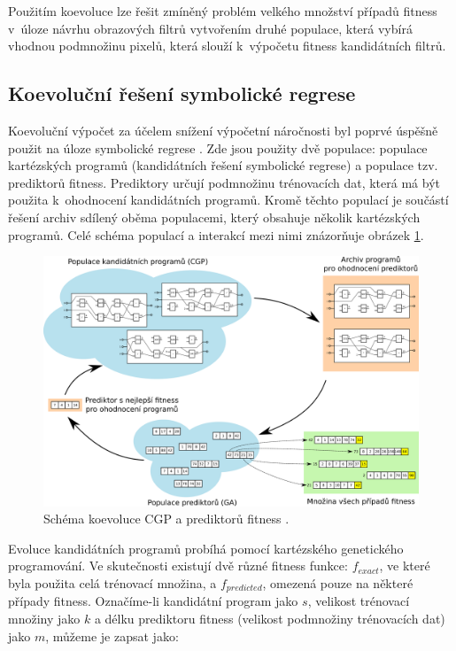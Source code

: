 Použitím koevoluce lze řešit zmíněný problém velkého množství případů fitness v~úloze návrhu obrazových filtrů vytvořením druhé populace, která vybírá vhodnou podmnožinu pixelů, která slouží k~výpočetu fitness kandidátních filtrů.


\subsection{Koevoluční řešení symbolické regrese}

Koevoluční výpočet za účelem snížení výpočetní náročnosti byl poprvé úspěšně použit na úloze symbolické regrese \cite{SikuEuroGP}. Zde jsou použity dvě populace: populace kartézských programů (kandidátních řešení symbolické regrese) a populace tzv. prediktorů fitness. Prediktory určují podmnožinu trénovacích dat, která má být použita k~ohodnocení kandidátních programů. Kromě těchto populací je součástí řešení archiv sdílený oběma populacemi, který obsahuje několik kartézských programů. Celé schéma populací a interakcí mezi nimi znázorňuje obrázek \ref{obrKoevoluce}.

\begin{figure}[htb]
    \centering\includegraphics[width=\textwidth]{fig/coevolution.pdf}
    \caption{Schéma koevoluce CGP a prediktorů fitness \cite{SikuEuroGP}.}
    \label{obrKoevoluce}
\end{figure}

Evoluce kandidátních programů probíhá pomocí kartézského genetického programování. Ve skutečnosti existují dvě různé fitness funkce: $f_{\mathit{exact}}$, ve které byla použita celá trénovací množina, a $f_{\mathit{predicted}}$, omezená pouze na některé případy fitness. Označíme-li kandidátní program jako $s$, velikost trénovací množiny jako $k$ a délku prediktoru fitness (velikost podmnožiny trénovacích dat) jako $m$, můžeme je zapsat jako:

